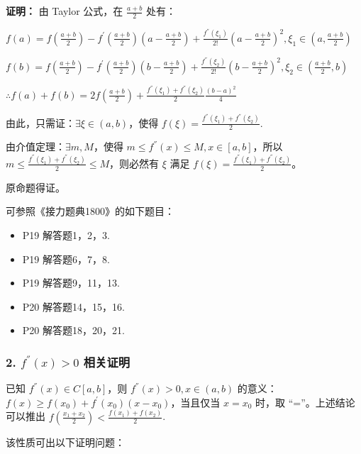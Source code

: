 \documentclass[b5paper]{ctexart}
\begin{document}
	\textbf{证明：} 由 Taylor 公式，在 $\frac{a + b}{2}$ 处有：
	
	$f(a) = f(\frac{a + b}{2}) - f^{'}(\frac{a + b}{2})(a - \frac{a + b}{2}) + \frac{f^{''}(\xi_1)}{2!}(a - \frac{a + b}{2})^{2}, \xi_1 \in (a, \frac{a + b}{2})$
	
	$f(b) = f(\frac{a + b}{2}) - f^{'}(\frac{a + b}{2})(b - \frac{a + b}{2}) + \frac{f^{''}(\xi_2)}{2!}(b - \frac{a + b}{2})^{2}, \xi_2 \in (\frac{a + b}{2}, b)$

	$\therefore f(a) + f(b) = 2f(\frac{a + b}{2}) + \frac{f^{''}(\xi_1) + f^{''}(\xi_2)}{2} \frac{(b - a)^2}{4}$
	
	由此，只需证：$\exists \xi \in (a, b)$，使得 $f(\xi) = \frac{f^{''}(\xi_1) + f^{''}(\xi_2)}{2}$.
	
	由介值定理：$\exists m, M$，使得 $m \le f^{''}(x) \le M, x \in [a, b]$，所以 $m \le \frac{f^{''}(\xi_1) + f^{''}(\xi_2)}{2} \le M$，则必然有 $\xi$ 满足 $f(\xi) = \frac{f^{''}(\xi_1) + f^{''}(\xi_2)}{2}$。
	
	原命题得证。
	
	\vspace{24pt}
	可参照《接力题典1800》的如下题目：
	\begin{itemize}
		\item P19 解答题1，2，3.
		
		\item P19 解答题6，7，8.
		
		\item P19 解答题9，11，13.
		
		\item P20 解答题14，15，16.
		
		\item P20 解答题18，20，21.
	\end{itemize}
	
	
	\subsubsection*{2. $f^{''}(x) > 0$ 相关证明}
	已知 $f^{''}(x) \in C[a, b]$，则 $f^{''}(x) > 0, x \in (a, b)$ 的意义：$f(x) \ge f(x_0) + f^{'}(x_0) (x - x_0)$，当且仅当 $x = x_0$ 时，取 “=”。上述结论可以推出 $f(\frac{x_1 + x_2}{2}) < \frac{f(x_1) + f(x_2)}{2}$.
	
	该性质可出以下证明问题：
	
\end{document}

